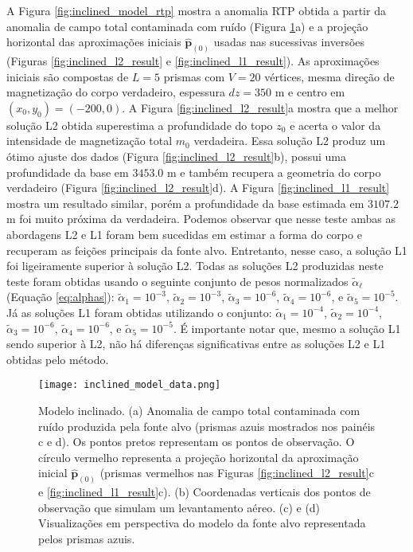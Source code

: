 A Figura \ref{fig:inclined_model_rtp} mostra a anomalia RTP obtida a partir da anomalia de campo total contaminada com ruído (Figura \ref{fig:inclined_model}a) e 
a projeção horizontal das aproximações iniciais $\hat{\mathbf{p}}_{(0)}$ 
usadas nas sucessivas inversões (Figuras \ref{fig:inclined_l2_result} e 
\ref{fig:inclined_l1_result}).
As aproximações iniciais são compostas de $ L= 5$ prismas com $ V = 20 $ vértices, mesma direção de magnetização do corpo verdadeiro, espessura $ dz=350 $ m e centro em $ (x_0, y_0) = (-200, 0) $.
A Figura \ref{fig:inclined_l2_result}a mostra que a melhor solução L2 obtida superestima a profundidade do topo $z_{0}$ e acerta o valor da intensidade de magnetização total $m_{0}$ verdadeira. Essa solução L2 produz um ótimo ajuste dos dados (Figura \ref{fig:inclined_l2_result}b), possui uma profundidade da base em $3453.0$ m e também recupera a geometria do corpo verdadeiro (Figura \ref{fig:inclined_l2_result}d).
A Figura \ref{fig:inclined_l1_result} mostra um resultado similar, porém a profundidade da base estimada em $3107.2$ m foi muito próxima da verdadeira.
Podemos observar que nesse teste ambas as abordagens L2 e L1 foram bem sucedidas em estimar a forma do corpo e recuperam as feições principais da fonte alvo. Entretanto, nesse caso, a solução L1 foi ligeiramente superior à solução L2.
Todas as soluções L2 produzidas neste teste foram obtidas usando o seguinte conjunto de pesos normalizados $\tilde{\alpha}_{\ell}$ (Equação \ref{eq:alphas}): 
$\tilde{\alpha}_{1} = 10^{-3}$, $\tilde{\alpha}_{2} = 10^{-3}$, 
$\tilde{\alpha}_{3} = 10^{-6}$, $\tilde{\alpha}_{4} = 10^{-6}$, e 
$\tilde{\alpha}_{5} = 10^{-5}$. 
Já as soluções L1 foram obtidas utilizando o conjunto: 
$\tilde{\alpha}_{1} = 10^{-4}$, $\tilde{\alpha}_{2} = 10^{-4}$, 
$\tilde{\alpha}_{3} = 10^{-6}$, $\tilde{\alpha}_{4} = 10^{-6}$, e 
$\tilde{\alpha}_{5} = 10^{-5}$.
É importante notar que, mesmo a solução L1 sendo superior à L2, não há diferenças significativas entre as soluções L2 e L1 obtidas pelo método.


\begin{figure}[!htb]
	\centering
 	\texttt{[image: inclined\_model\_data.png]}
	\caption{Modelo inclinado. (a) Anomalia de campo total contaminada com ruído produzida pela fonte alvo (prismas azuis mostrados nos painéis c e d). Os pontos pretos representam os pontos de observação. O círculo vermelho representa a projeção horizontal da aproximação inicial $\hat{\mathbf{p}}_{(0)}$ (prismas vermelhos nas Figuras
		\ref{fig:inclined_l2_result}c e \ref{fig:inclined_l1_result}c). (b) Coordenadas verticais dos pontos de observação que simulam um levantamento aéreo.
		(c) e (d) Visualizações em perspectiva do modelo da fonte alvo representada pelos prismas azuis.
	}
	\label{fig:inclined_model}
\end{figure}
\pagebreak

